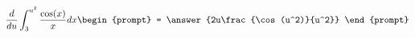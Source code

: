 \documentclass{ximera}
\author{Steven Gubkin}
\begin{document}
\begin{exercise}

\[
\frac{d}{du} \int_3^{u^2} \frac{\cos(x)}{x} dx \begin{prompt} = \answer{2u\frac{\cos(u^2)}{u^2}} \end{prompt}
\]

\end{exercise}
\end{document}
